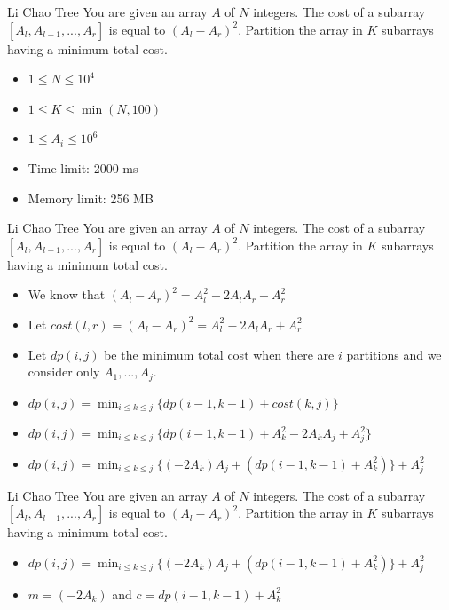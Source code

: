 \documentclass[aspectratio=169,xcolor=dvipsnames]{beamer}
\begin{document}
\begin{frame}{Li Chao Tree}
You are given an array $A$ of $N$ integers. The cost of a subarray $[A_l, A_{l+1}, ..., A_r]$ is equal to $(A_l - A_r)^2$. Partition the array in $K$ subarrays having a minimum total cost.
\begin{itemize}
    \item $1 \leq N \leq 10^4$
    \item $1 \leq K \leq \min(N, 100)$
    \item $1 \leq A_i \leq 10^6$
    \item Time limit: 2000 ms
    \item Memory limit: 256 MB
\end{itemize}
\end{frame}

\begin{frame}{Li Chao Tree}
You are given an array $A$ of $N$ integers. The cost of a subarray $[A_l, A_{l+1}, ..., A_r]$ is equal to $(A_l - A_r)^2$. Partition the array in $K$ subarrays having a minimum total cost.
\begin{itemize}
    \item We know that $(A_l - A_r)^2 = A_l^2 - 2A_lA_r + A_r^2$
    \pause
    \item Let $cost(l, r) = (A_l - A_r)^2 = A_l^2 - 2A_lA_r + A_r^2$
    \pause
    \item Let $dp(i, j)$ be the minimum total cost when there are $i$ partitions and we consider only $A_1, ..., A_j$.
    \pause
    \item $dp(i, j) = \displaystyle\min_{i\leq k\leq j}\{dp(i-1, k-1) + cost(k, j)\}$
    \pause
    \item $dp(i, j) = \displaystyle\min_{i\leq k\leq j}\{dp(i-1, k-1) + A_k^2 - 2A_kA_j + A_j^2\}$
    \pause
    \item $dp(i, j) = \displaystyle\min_{i\leq k\leq j}\{(-2A_k)A_j + (dp(i-1, k-1) + A_k^2)\} + A_j^2$
\end{itemize}
\end{frame}

\begin{frame}{Li Chao Tree}
You are given an array $A$ of $N$ integers. The cost of a subarray $[A_l, A_{l+1}, ..., A_r]$ is equal to $(A_l - A_r)^2$. Partition the array in $K$ subarrays having a minimum total cost.
\begin{itemize}
    \item $dp(i, j) = \displaystyle\min_{i\leq k\leq j}\{(-2A_k)A_j + (dp(i-1, k-1) + A_k^2)\} + A_j^2$
    \pause
    \item $m = (-2A_k)$ and $c = dp(i-1, k-1) + A_k^2$
\end{itemize}
\end{frame}
\end{document}
